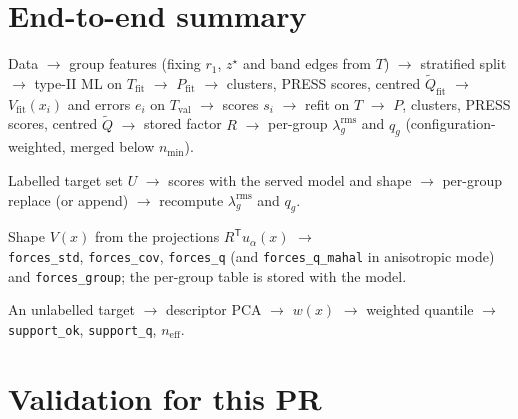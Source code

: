 \documentclass[11pt,a4paper]{article}
\newcommand{\T}{\mathsf{T}}
\newcommand{\Tfit}{T_{\mathrm{fit}}}
\newcommand{\Tval}{T_{\mathrm{val}}}
\newcommand{\Qt}{\tilde{Q}}
\newcommand{\nmin}{n_{\min}}
\newcommand{\code}[1]{\texttt{#1}}
\begin{document}
\section{End-to-end summary}

\begin{description}[style=nextline,leftmargin=1.2em]
\item[fit] Data $\to$ group features (fixing $r_1$, $z^\star$ and band edges from $T$) $\to$
stratified split $\to$ type-II ML on $\Tfit$ $\to$ $P_{\mathrm{fit}}$ $\to$ clusters, PRESS scores,
centred $\Qt_{\mathrm{fit}}$ $\to$ $V_{\mathrm{fit}}(x_i)$ and errors $e_i$ on $\Tval$ $\to$ scores
$s_i$ $\to$ refit on $T$ $\to$ $P$, clusters, PRESS scores, centred $\Qt$ $\to$ stored factor $R$ $\to$
per-group $\lambda^{\mathrm{rms}}_g$ and $q_g$ (configuration-weighted, merged below $\nmin$).
\item[calibrate] Labelled target set $U$ $\to$ scores with the served model and shape $\to$ per-group
replace (or append) $\to$ recompute $\lambda^{\mathrm{rms}}_g$ and $q_g$.
\item[serve] Shape $V(x)$ from the projections $R^\T u_\alpha(x)$ $\to$\\ \code{forces\_std},
\code{forces\_cov}, \code{forces\_q} (and \code{forces\_q\_mahal} in anisotropic mode) and
\code{forces\_group}; the per-group table is stored with the model.
\item[diagnose] An unlabelled target $\to$ descriptor PCA $\to$ $w(x)$ $\to$ weighted quantile $\to$
\code{support\_ok}, \code{support\_q}, $n_{\mathrm{eff}}$.
\end{description}

\section{Validation for this PR}\label{sec:validation}
\end{document}
